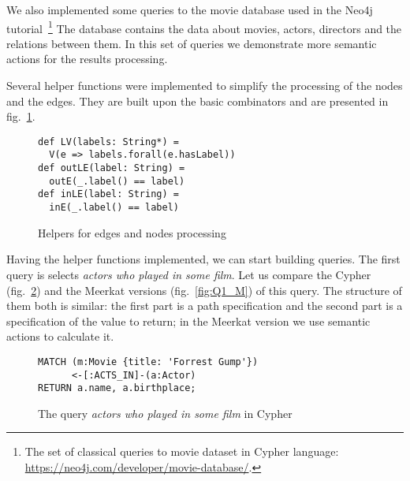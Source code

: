 We also implemented some queries to the movie database used in the Neo4j tutorial~\footnote{The set of classical queries to movie dataset in Cypher language: \url{https://neo4j.com/developer/movie-database/}.}
The database contains the data about movies, actors, directors and the relations between them.
In this set of queries we demonstrate more semantic actions for the results processing. 


Several helper functions were implemented to simplify the processing of the nodes and the edges. 
They are built upon the basic combinators and are presented in fig.~\ref{fig:helpers}.


\begin{figure}[h]
\begin{lstlisting}
def LV(labels: String*) = 
  V(e => labels.forall(e.hasLabel))
def outLE(label: String) = 
  outE(_.label() == label)
def inLE(label: String) = 
  inE(_.label() == label)
\end{lstlisting}
\caption{Helpers for edges and nodes processing}
\label{fig:helpers}
\end{figure}

Having the helper functions implemented, we can start building queries. 
The first query is selects \emph{actors who played in some film}.
Let us compare the Cypher (fig.~\ref{fig:Q1_C}) and the Meerkat versions (fig.~\ref{fig:Q1_M}) of this query.
The structure of them both is similar: the first part is a path specification and the second part is a specification of the value to return; in the Meerkat version we use semantic actions to calculate it.

\begin{figure}[h]
\begin{lstlisting}
MATCH (m:Movie {title: 'Forrest Gump'})
      <-[:ACTS_IN]-(a:Actor)
RETURN a.name, a.birthplace;
\end{lstlisting}
\caption{The query \emph{actors who played in some film} in Cypher}
\label{fig:Q1_C}
\end{figure}


